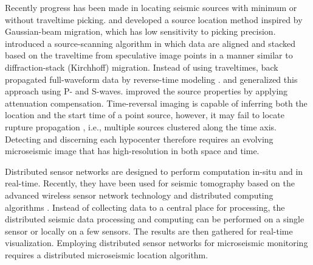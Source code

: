 
Recently progress has been made in locating seismic sources with minimum or without traveltime picking. \cite{rentsch2006fast} and \cite{rentsch2010migration} developed a source location method inspired by Gaussian-beam migration, which has low sensitivity to picking precision. \cite{kaoshan04} introduced a source-scanning algorithm in which data are aligned and stacked based on the traveltime from speculative image points in a manner similar to diffraction-stack (Kirchhoff) migration. Instead of using traveltimes, \cite{gajewski05} back propagated full-waveform data by reverse-time modeling \cite[]{mcmechan82}. \cite{atm10} and \cite{witten11} generalized this approach using P- and S-waves. \cite{zhu2014time} improved the source properties by applying attenuation compensation. Time-reversal imaging is capable of inferring both the location and the start time of a point source, however, it may fail to locate rupture propagation \cite[]{kremers11}, i.e., multiple sources clustered along the time axis. Detecting and discerning each hypocenter therefore requires an evolving microseismic image that has high-resolution in both space and time.

Distributed sensor networks are designed to perform computation in-situ and in real-time. Recently, they have been used for seismic tomography based on the advanced wireless sensor network technology and distributed computing algorithms \cite[]{SSXX-SECON2013,SLK-SEG2015}. Instead of collecting data to a central place for processing, the distributed seismic data processing and computing can be performed on a single sensor or locally on a few sensors. The results are then gathered for real-time visualization. Employing distributed sensor networks for microseismic monitoring requires a distributed microseismic location algorithm.

